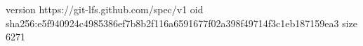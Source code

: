 version https://git-lfs.github.com/spec/v1
oid sha256:e5f940924c4985386ef7b8b2f116a6591677f02a398f49714f3c1eb187159ea3
size 6271
